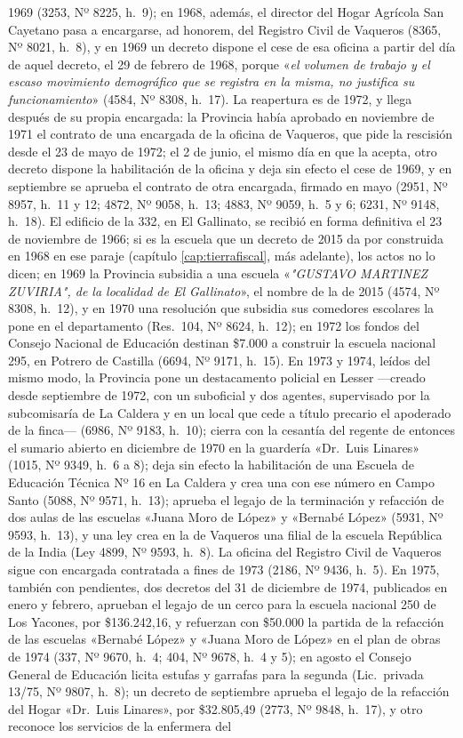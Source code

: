1969 (3253, Nº 8225, h.\ 9); en 1968, además, el director del Hogar Agrícola San Cayetano pasa a encargarse, ad honorem, del Registro Civil de Vaqueros (8365, Nº 8021, h.\ 8), y en 1969 un decreto dispone el cese de esa oficina a partir del día de aquel decreto, el 29 de febrero de 1968, porque «\textit{el volumen de trabajo y el escaso movimiento demográfico que se registra en la misma, no justifica su funcionamiento}» (4584, Nº 8308, h.\ 17). La reapertura es de 1972, y llega después de su propia encargada: la Provincia había aprobado en noviembre de 1971 el contrato de una encargada de la oficina de Vaqueros, que pide la rescisión desde el 23 de mayo de 1972; el 2 de junio, el mismo día en que la acepta, otro decreto dispone la habilitación de la oficina y deja sin efecto el cese de 1969, y en septiembre se aprueba el contrato de otra encargada, firmado en mayo (2951, Nº 8957, h.\ 11 y 12; 4872, Nº 9058, h.\ 13; 4883, Nº 9059, h.\ 5 y 6; 6231, Nº 9148, h.\ 18). El edificio de la 332, en El Gallinato, se recibió en forma definitiva el 23 de noviembre de 1966; si es la escuela que un decreto de 2015 da por construida en 1968 en ese paraje (capítulo \ref{cap:tierrafiscal}, más adelante), los actos no lo dicen; en 1969 la Provincia subsidia a una escuela «\textit{"GUSTAVO MARTINEZ ZUVIRIA", de la localidad de El Gallinato}», el nombre de la de 2015 (4574, Nº 8308, h.\ 12), y en 1970 una resolución que subsidia sus comedores escolares la pone en el departamento (Res.\ 104, Nº 8624, h.\ 12); en 1972 los fondos del Consejo Nacional de Educación destinan \$7.000 a construir la escuela nacional 295, en Potrero de Castilla (6694, Nº 9171, h.\ 15). En 1973 y 1974, leídos del mismo modo, la Provincia pone un destacamento policial en Lesser ---creado desde septiembre de 1972, con un suboficial y dos agentes, supervisado por la subcomisaría de La Caldera y en un local que cede a título precario el apoderado de la finca--- (6986, Nº 9183, h.\ 10); cierra con la cesantía del regente de entonces el sumario abierto en diciembre de 1970 en la guardería «Dr.\ Luis Linares» (1015, Nº 9349, h.\ 6 a 8); deja sin efecto la habilitación de una Escuela de Educación Técnica Nº 16 en La Caldera y crea una con ese número en Campo Santo (5088, Nº 9571, h.\ 13); aprueba el legajo de la terminación y refacción de dos aulas de las escuelas «Juana Moro de López» y «Bernabé López» (5931, Nº 9593, h.\ 13), y una ley crea en la de Vaqueros una filial de la escuela República de la India (Ley 4899, Nº 9593, h.\ 8). La oficina del Registro Civil de Vaqueros sigue con encargada contratada a fines de 1973 (2186, Nº 9436, h.\ 5). En 1975, también con pendientes, dos decretos del 31 de diciembre de 1974, publicados en enero y febrero, aprueban el legajo de un cerco para la escuela nacional 250 de Los Yacones, por \$136.242,16, y refuerzan con \$50.000 la partida de la refacción de las escuelas «Bernabé López» y «Juana Moro de López» en el plan de obras de 1974 (337, Nº 9670, h.\ 4; 404, Nº 9678, h.\ 4 y 5); en agosto el Consejo General de Educación licita estufas y garrafas para la segunda (Lic.\ privada 13/75, Nº 9807, h.\ 8); un decreto de septiembre aprueba el legajo de la refacción del Hogar «Dr.\ Luis Linares», por \$32.805,49 (2773, Nº 9848, h.\ 17), y otro reconoce los servicios de la enfermera del 